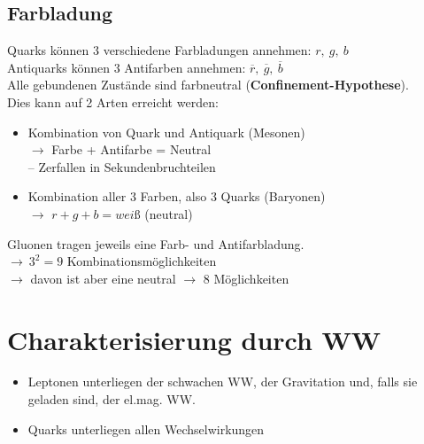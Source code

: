 \documentclass[Ex4_Zusammenfassung.tex]{subfiles}
\begin{document}
\subsection{Farbladung}
Quarks können 3 verschiedene Farbladungen annehmen: $r,\ g,\ b$\\
Antiquarks können 3 Antifarben annehmen: $\overline{r},\ \overline{g},\ \overline{b}$\\

Alle gebundenen Zustände sind farbneutral (\textbf{Confinement-Hypothese}).\\
Dies kann auf 2 Arten erreicht werden:
\begin{itemize}
	\item Kombination von Quark und Antiquark (Mesonen)\\
	$\rightarrow$ Farbe + Antifarbe = Neutral\\
	\quad -- Zerfallen in Sekundenbruchteilen
	\item Kombination aller 3 Farben, also 3 Quarks (Baryonen)\\
	$\rightarrow$ $r+g+b=weiß$ (neutral)
\end{itemize}

Gluonen tragen jeweils eine Farb- und Antifarbladung.\\
$\rightarrow\ 3^2 = 9$ Kombinationsmöglichkeiten\\
$\rightarrow$ davon ist aber eine neutral $\rightarrow$ 8 Möglichkeiten

\section{Charakterisierung durch WW}
\begin{itemize}
	\item Leptonen unterliegen der schwachen WW, der Gravitation und, falls sie geladen sind, der el.mag. WW.
	\item Quarks unterliegen allen Wechselwirkungen
\end{itemize}
\end{document}
